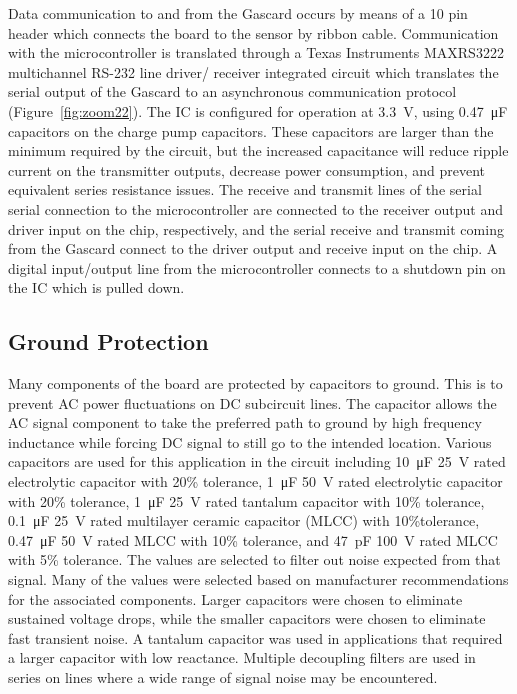 \documentclass[numbook, envcountsect, envcountsame, envcountreset, runningheads, twocolumn]{svjour3}
\begin{document}
			Data communication to and from the Gascard occurs by means of a 10 pin header which connects the board to the sensor by ribbon cable.  Communication with the microcontroller is translated through a Texas Instruments MAXRS3222 multichannel RS-232 line driver/ receiver integrated circuit which translates the serial output of the Gascard to an asynchronous communication protocol (Figure~\ref{fig:zoom22}).  The IC is configured for operation at \SI{3.3}{\volt}, using \SI{0.47}{\micro\farad} capacitors on the charge pump capacitors.  These capacitors are larger than the minimum required by the circuit, but the increased capacitance will reduce ripple current on the transmitter outputs, decrease power consumption, and prevent equivalent series resistance issues.  The receive and transmit lines of the serial serial connection to the microcontroller are connected to the receiver output and driver input on the chip, respectively, and the serial receive and transmit coming from the Gascard connect to the driver output and receive input on the chip.  A digital input/output line from the microcontroller connects to a shutdown pin on the IC which is pulled down.
			
		\subsection{Ground Protection}
			Many components of the board are protected by capacitors to ground.  This is to prevent AC power fluctuations on DC subcircuit lines.  The capacitor allows the AC signal component to take the preferred path to ground by high frequency inductance while forcing DC signal to still go to the intended location.  Various capacitors are used for this application in the circuit including \SI{10}{\micro\farad} \SI{25}{\volt} rated electrolytic capacitor with 20\% tolerance, \SI{1}{\micro\farad} \SI{50}{\volt} rated electrolytic capacitor with 20\% tolerance, \SI{1}{\micro\farad} \SI{25}{\volt} rated tantalum capacitor with 10\% tolerance, \SI{0.1}{\micro\farad} \SI{25}{\volt} rated multilayer ceramic capacitor (MLCC) with 10\%tolerance, \SI{0.47}{\micro\farad} \SI{50}{\volt} rated MLCC with 10\% tolerance, and \SI{47}{\pico\farad} \SI{100}{\volt} rated MLCC with 5\% tolerance.  The values are selected to filter out noise expected from that signal.  Many of the values were selected based on manufacturer recommendations for the associated components.  Larger capacitors were chosen to eliminate sustained voltage drops, while the smaller capacitors were chosen to eliminate fast transient noise.  A tantalum capacitor was used in applications that required a larger capacitor with low reactance.  Multiple decoupling filters are used in series on lines where a wide range of signal noise may be encountered.
			
\end{document}

